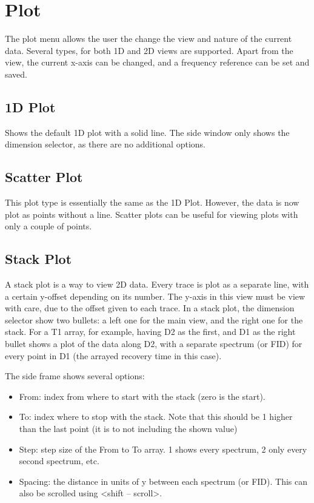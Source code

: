 \documentclass[11pt,a4paper]{article}
\begin{document}
\section{Plot}
The plot menu allows the user the change the view and nature of the current data. Several types, for both 1D and 2D views are supported. Apart from the view, the current x-axis can be changed, and a 
frequency reference can be set and saved. 


\subsection{1D Plot}
Shows the default 1D plot with a solid line. The side window only shows the dimension selector, as there are no additional options.


\subsection{Scatter Plot}
This plot type is essentially the same as the 1D Plot. However, the data is now plot as points without a line. Scatter plots can be useful for viewing 
plots with only a couple of points.

\subsection{Stack Plot}
A stack plot is a way to view 2D data. Every trace is plot as a separate line, with a certain y-offset depending on its number. The y-axis in this view must be view with care,
due to the offset given to each trace. In a stack plot, the dimension selector show two bullets: a left one for the main view, and the right one for the stack. For a T1 array, for example, having D2 as the first, and D1 
as the right bullet shows a plot of the data along D2, with a separate spectrum (or FID) for every point in D1 (the arrayed recovery time in this case).

The side frame shows several options:
\begin{itemize}
  \item From: index from where to start with the stack (zero is the start).
  \item To: index where to stop with the stack. Note that this should be 1 higher than the last point (it is to not including the shown value)
  \item Step: step size of the From to To array. 1 shows every spectrum, 2 only every second spectrum, etc.
  \item Spacing: the distance in units of y between each spectrum (or FID). This can also be scrolled using <shift -- scroll>.
\end{itemize}
\end{document}
